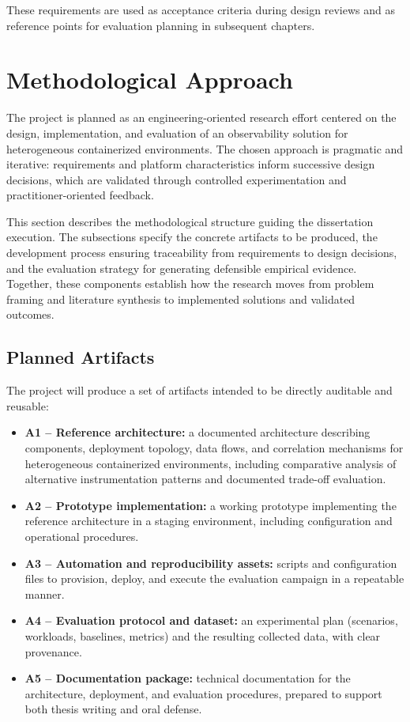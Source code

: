 These requirements are used as acceptance criteria during design reviews and as reference points for evaluation planning in subsequent chapters.

\section{Methodological Approach}
\label{sec:ch3_method}

The project is planned as an engineering-oriented research effort centered on the design, implementation, and evaluation of an observability solution for heterogeneous containerized environments. The chosen approach is pragmatic and iterative: requirements and platform characteristics inform successive design decisions, which are validated through controlled experimentation and practitioner-oriented feedback.

This section describes the methodological structure guiding the dissertation execution. The subsections specify the concrete artifacts to be produced, the development process ensuring traceability from requirements to design decisions, and the evaluation strategy for generating defensible empirical evidence. Together, these components establish how the research moves from problem framing and literature synthesis to implemented solutions and validated outcomes.

\subsection{Planned Artifacts}
\label{sec:ch3_artifacts}

The project will produce a set of artifacts intended to be directly auditable and reusable:
\begin{itemize}
    \item \textbf{A1 -- Reference architecture:} a documented architecture describing components, deployment topology, data flows, and correlation mechanisms for heterogeneous containerized environments, including comparative analysis of alternative instrumentation patterns and documented trade-off evaluation.
    \item \textbf{A2 -- Prototype implementation:} a working prototype implementing the reference architecture in a staging environment, including configuration and operational procedures.
    \item \textbf{A3 -- Automation and reproducibility assets:} scripts and configuration files to provision, deploy, and execute the evaluation campaign in a repeatable manner.
    \item \textbf{A4 -- Evaluation protocol and dataset:} an experimental plan (scenarios, workloads, baselines, metrics) and the resulting collected data, with clear provenance.
    \item \textbf{A5 -- Documentation package:} technical documentation for the architecture, deployment, and evaluation procedures, prepared to support both thesis writing and oral defense.
\end{itemize}

